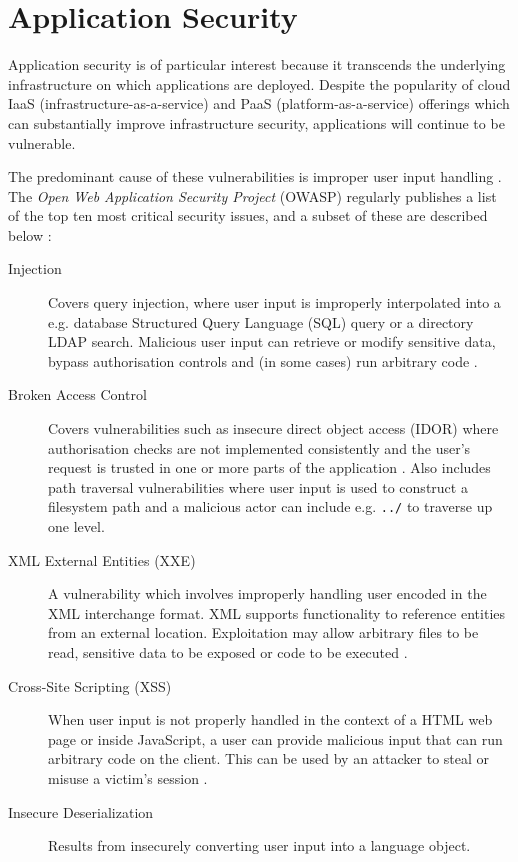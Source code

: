 \documentclass[a4paper,openany,12pt]{book}
\begin{document}
\section{Application Security}

Application security is of particular interest because it transcends the underlying infrastructure on which applications
are deployed.
Despite the popularity of cloud IaaS (infrastructure-as-a-service) and PaaS (platform-as-a-service)
offerings which can substantially improve infrastructure security, applications will continue to be vulnerable.

The predominant cause of these vulnerabilities is improper user input handling \citep{schneier2011secrets}.
The \emph{Open Web Application Security Project} (OWASP) regularly publishes a list of the top ten most critical
security issues, and a subset of these are described below \citep{owasp10}:

\begin{description}
    \item[Injection] Covers query injection, where user input is improperly interpolated into a e.g. database Structured
                     Query Language (SQL) query or a directory LDAP search. Malicious user input can retrieve or modify
                     sensitive data, bypass authorisation controls and (in some cases) run arbitrary code \citep[p.~291]{stuttard2011web}.
    \item[Broken Access Control] Covers vulnerabilities such as insecure direct object access (IDOR) where authorisation
                                 checks are not implemented consistently and the user's request is trusted in one or
                                 more parts of the application \citep[p.~257]{stuttard2011web}. Also includes path
                                 traversal vulnerabilities where user input is used to construct a filesystem path and a
                                 malicious actor can include e.g. \texttt{../} to traverse up one level.
    \item[XML External Entities (XXE)] A vulnerability which involves improperly handling user encoded in the XML
                                       interchange format. XML supports functionality to reference entities from an
                                       external location. Exploitation may allow arbitrary files to be read, sensitive
                                       data to be exposed or code to be executed  \citep[p.~384]{stuttard2011web}.
    \item[Cross-Site Scripting (XSS)] When user input is not properly handled in the context of a HTML web page or
                                      inside JavaScript, a user can provide malicious input that can run arbitrary code
                                      on the client. This can be used by an attacker to steal or misuse a victim's
                                      session \citep[p.~431]{stuttard2011web}.
    \item[Insecure Deserialization] Results from insecurely converting user input into a language object.
\end{description}
\end{document}
